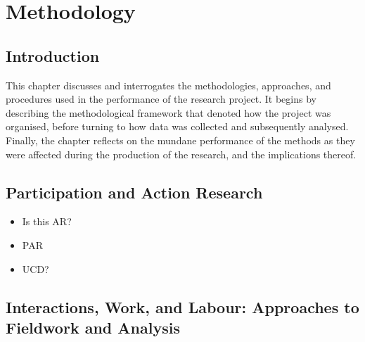 \chapter{Methodology}
\label{sec:method}

\section{Introduction}
This chapter discusses and interrogates the methodologies, approaches, and procedures used in the performance of the research project. It begins by describing the methodological framework that denoted how the project was organised, before turning to how data was collected and subsequently analysed. Finally, the chapter reflects on the mundane performance of the methods as they were affected during the production of the research, and the implications thereof.
%
%
%
\section{Participation and Action Research}
\label{sec:method:approach}
%
\begin{itemize}
\item Is this AR?
\item PAR
\item UCD?
\end{itemize}


\section{Interactions, Work, and Labour: Approaches to Fieldwork and Analysis}
\label{sec:method:fieldwork}





